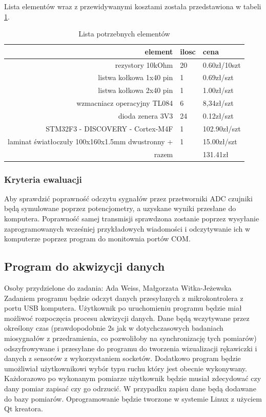 \documentclass{article}
\begin{document}
Lista elementów wraz z przewidywanymi kosztami została przedstawiona w tabeli \ref{tab:interfejs}.
\begin{table}[ht!]
\centering
\caption{ Lista potrzebnych elementów}

\begin{tabular}{|r|l|l|} \hline

element & ilosc & cena\\ \hline
rezystory 10kOhm & 20 & 0.60zł/10szt \\
listwa kołkowa 1x40 pin & 1 & 0.69zł/szt \\
listwa kołkowa 2x40 pin & 1 & 1.00zł/szt \\
wzmacniacz operacyjny TL084 & 6 & 8,34zł/szt \\
dioda zenera 3V3 & 24 & 0.12zł/szt \\
STM32F3 - DISCOVERY - Cortex-M4F & 1 & 102.90zł/szt \\
laminat światłoczuły 100x160x1.5mm dwustronny + & 1 & 15.00zł/szt \\\hline %
razem & & 131.41zł \\\hline
\end{tabular}
\label{tab:interfejs}
\end{table}


\subsubsection{Kryteria ewaluacji}
Aby sprawdzić poprawność odczytu sygnałów przez przetworniki ADC czujniki będą symulowane poprzez potencjometry, a uzyskane wyniki przesłane do komputera. Poprawność samej transmisji sprawdzona zostanie poprzez wysyłanie zaprogramowanych wcześniej przykładowych wiadomości i odczytywanie ich w komputerze poprzez program do monitownia portów COM.
\subsection{Program do akwizycji danych}
Osoby przydzielone do zadania: Ada Weiss, Małgorzata Witka-Jeżewska\\
Zadaniem programu będzie odczyt danych przesyłanych z mikrokontrolera z portu USB komputera. Użytkownik po uruchomieniu programu będzie miał możliwoć rozpoczęcia procesu akwizycji danych. Dane będą wczytywane przez określony czas (prawdopodobnie 2s jak w dotychczasowych badaniach miosygnałów z przedramienia, co pozwoliłoby na synchronizację tych pomiarów) odszyfrowywane i przesyłane do programu do tworzenia wizualizacji rękawiczki i danych z sensorów z wykorzystaniem socketów. Dodatkowo program będzie umożliwiał użytkownikowi wybór typu ruchu który jest obecnie wykonywany. Każdorazowo po wykonanym pomiarze użytkownik będzie musiał zdecydować czy dany pomiar zapisać czy go odrzucić. W przypadku zapisu dane będą dodawane do bazy pomiarów. Oprogramowanie będzie tworzone w systemie Linux z użyciem Qt kreatora.
\end{document}
